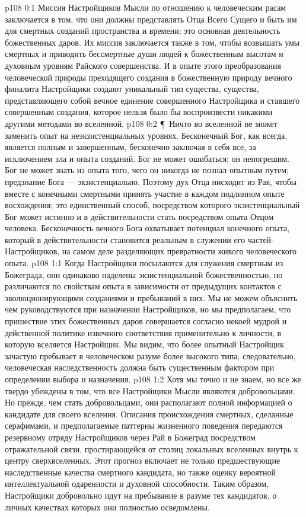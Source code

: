 \vs p108 0:1 Миссия Настройщиков Мысли по отношению к человеческим расам заключается в том, что они должны представлять Отца Всего Сущего и быть им для смертных созданий пространства и времени; это основная деятельность божественных даров. Их миссия заключается также в том, чтобы возвышать умы смертных и приводить бессмертные души людей к божественным высотам и духовным уровням Райского совершенства. И в опыте этого преобразования человеческой природы преходящего создания в божественную природу вечного финалита Настройщики создают уникальный тип существа, существа, представляющего собой вечное единение совершенного Настройщика и ставшего совершенным создания, которое нельзя было бы воспроизвести никакими другими методами во вселенной.
\vs p108 0:2 \P\ Ничто во вселенной не может заменить опыт на неэкзистенциальных уровнях. Бесконечный Бог, как всегда, является полным и завершенным, бесконечно заключая в себя все, за исключением зла и опыта созданий. Бог не может ошибаться; он непогрешим. Бог не может знать из опыта того, чего он никогда не познал опытным путем; предзнание Бога --- экзистенциально. Поэтому дух Отца нисходит из Рая, чтобы вместе с конечными смертными принять участие в каждом подлинном опыте восхождения; это единственный способ, посредством которого экзистенциальный Бог может истинно и в действительности стать посредством опыта Отцом человека. Бесконечность вечного Бога охватывает потенциал конечного опыта, который в действительности становится реальным в служении его частей\hyp{}Настройщиков, на самом деле разделяющих превратности живого человеческого опыта.
\vs p108 1:1 Когда Настройщики посылаются для служения смертным из Божеграда, они одинаково наделены экзистенциальной божественностью, но различаются по свойствам опыта в зависимости от предыдущих контактов с эволюционирующими созданиями и пребываний в них. Мы не можем объяснить чем руководствуются при назначении Настройщиков, но мы предполагаем, что пришествие этих божественных даров совершается согласно некоей мудрой и действенной политике извечного соответствия применительно к личности, в которую вселяется Настройщик. Мы видим, что более опытный Настройщик зачастую пребывает в человеческом разуме более высокого типа; следовательно, человеческая наследственность должна быть существенным фактором при определении выбора и назначения.
\vs p108 1:2 Хотя мы точно и не знаем, но все же твердо убеждены в том, что все Настройщики Мысли являются добровольцами. Но прежде, чем стать добровольцами, они располагают полной информацией о кандидате для своего вселения. Описания происхождения смертных, сделанные серафимами, и предполагаемые паттерны жизненного поведения передаются резервному отряду Настройщиков через Рай в Божеград посредством отражательной связи, простирающейся от столиц локальных вселенных внутрь к центру сверхвселенных. Этот прогноз включает не только предшествующие наследственные качества смертного кандидата, но также оценку вероятной интеллектуальной одаренности и духовной способности. Таким образом, Настройщики добровольно идут на пребывание в разуме тех кандидатов, о личных качествах которых они полностью осведомлены.

